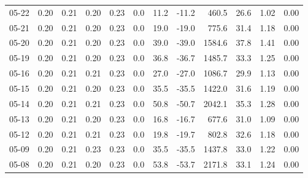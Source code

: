 \begin{threeparttable}
{\begin{tabular}{lrrrrrrrrrrr}
  05-22 &          0.20 &          0.21 &          0.20 &        0.23 &                 0.0 &                11.2 &      -11.2 &               460.5 &             26.6 &            1.02 &                   0.00 \\
  05-21 &          0.20 &          0.21 &          0.20 &        0.23 &                 0.0 &                19.0 &      -19.0 &               775.6 &             31.4 &            1.18 &                   0.00 \\
  05-20 &          0.20 &          0.21 &          0.20 &        0.23 &                 0.0 &                39.0 &      -39.0 &              1584.6 &             37.8 &            1.41 &                   0.00 \\
  05-19 &          0.20 &          0.21 &          0.20 &        0.23 &                 0.0 &                36.8 &      -36.7 &              1485.7 &             33.3 &            1.25 &                   0.00 \\
  05-16 &          0.20 &          0.21 &          0.21 &        0.23 &                 0.0 &                27.0 &      -27.0 &              1086.7 &             29.9 &            1.13 &                   0.00 \\
  05-15 &          0.20 &          0.21 &          0.20 &        0.23 &                 0.0 &                35.5 &      -35.5 &              1422.0 &             31.6 &            1.19 &                   0.00 \\
  05-14 &          0.20 &          0.21 &          0.21 &        0.23 &                 0.0 &                50.8 &      -50.7 &              2042.1 &             35.3 &            1.28 &                   0.00 \\
  05-13 &          0.20 &          0.21 &          0.20 &        0.23 &                 0.0 &                16.8 &      -16.7 &               677.6 &             31.0 &            1.09 &                   0.00 \\
  05-12 &          0.20 &          0.21 &          0.21 &        0.23 &                 0.0 &                19.8 &      -19.7 &               802.8 &             32.6 &            1.18 &                   0.00 \\
  05-09 &          0.20 &          0.21 &          0.23 &        0.23 &                 0.0 &                35.5 &      -35.5 &              1437.8 &             33.0 &            1.22 &                   0.00 \\
  05-08 &          0.20 &          0.21 &          0.20 &        0.23 &                 0.0 &                53.8 &      -53.7 &              2171.8 &             33.1 &            1.24 &                   0.00 \\

\end{tabular}}
\end{threeparttable}

